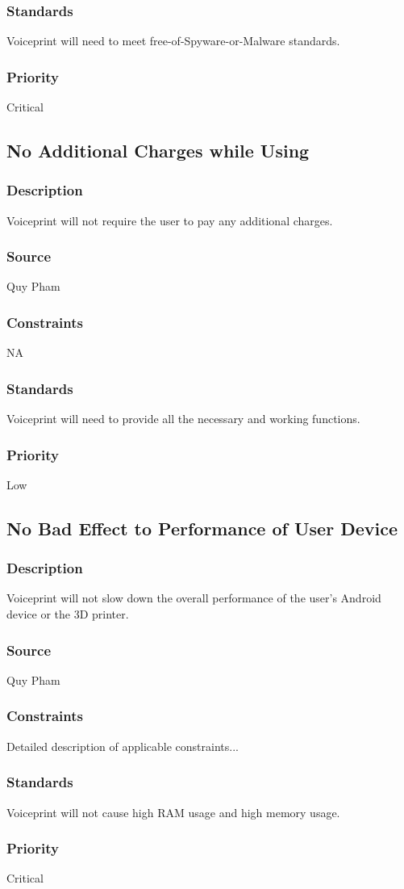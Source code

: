 \subsubsection{Standards}
Voiceprint will need to meet free-of-Spyware-or-Malware standards.
\subsubsection{Priority}
Critical

\subsection{No Additional Charges while Using}
\subsubsection{Description}
Voiceprint will not require the user to pay any additional charges.
\subsubsection{Source}
Quy Pham
\subsubsection{Constraints}
NA
\subsubsection{Standards}
Voiceprint will need to provide all the necessary and working functions.
\subsubsection{Priority}
Low

\subsection{No Bad Effect to Performance of User Device}
\subsubsection{Description}
Voiceprint will not slow down the overall performance of the user's Android device or the 3D printer.
\subsubsection{Source}
Quy Pham
\subsubsection{Constraints}
Detailed description of applicable constraints...
\subsubsection{Standards}
Voiceprint will not cause high RAM usage and high memory usage.
\subsubsection{Priority}
Critical